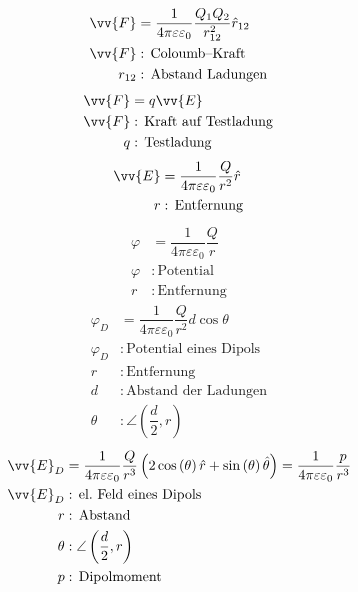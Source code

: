 \documentclass[a4paper,12pt]{article}
\numberwithin{equation}{section}
\begin{document}
\begin{align} 
        \vv{F}&=\dfrac{1}{4\pi \varepsilon \varepsilon _0}\dfrac{Q_1Q_2}{r_{12}^2}\hat{r}_{12}\\
        \vv{F}&:\,\text{Coloumb--Kraft}\,\nonumber \\
        r_{12}&:\,\text{Abstand Ladungen}\,\nonumber 
\end{align} 
\begin{align} 
        \vv{F}&=q\vv{E}\\
        \vv{F}&:\,\text{Kraft auf Testladung}\,\nonumber \\
        q&:\,\text{Testladung}\,\nonumber \\
\end{align} 
\begin{align} 
        \vv{E}&=\dfrac{1}{4\pi \varepsilon \varepsilon _0}\dfrac{Q}{r^2}\hat{r}\\
        r&:\,\text{Entfernung}\,\nonumber 
\end{align} 
\begin{align} 
        \varphi &=\dfrac{1}{4\pi \varepsilon \varepsilon _0}\dfrac{Q}{r}\\
        \varphi &:\,\text{Potential}\,\nonumber \\
        r&:\,\text{Entfernung}\,\nonumber 
\end{align} 
\begin{align} 
        \varphi _D&=\dfrac{1}{4\pi \varepsilon \varepsilon _0}\dfrac{Q}{r^2}d\cos \theta \\
        \varphi _D&:\,\text{Potential eines Dipols}\,\nonumber \\
        r&:\,\text{Entfernung}\,\nonumber \\
        d&:\,\text{Abstand der Ladungen}\,\nonumber \\
        \theta &:\angle\left(\dfrac{d}{2},r\right)\nonumber 
\end{align}
\begin{align} 
        \vv{E}_D&=\dfrac{1}{4\pi \varepsilon \varepsilon _0}\dfrac{Q}{r^3}\left(2\cos \left(\theta \right)\hat{r}+\sin \left(\theta \right)\hat{\theta }\right)=\dfrac{1}{4\pi \varepsilon \varepsilon _0}\dfrac{p}{r^3}\\
        \vv{E}_D&:\,\text{el.\ Feld eines Dipols}\,\nonumber \\
        r&:\,\text{Abstand}\,\nonumber \\
        \theta &:\angle\left(\dfrac{d}{2},r\right)\nonumber \\
        p&:\,\text{Dipolmoment}\,\nonumber 
\end{align} 
\end{document}

